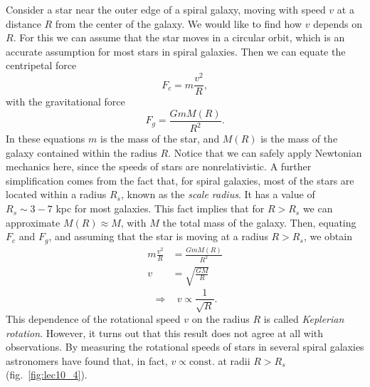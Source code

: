 Consider a star near the outer edge of a spiral galaxy, moving with speed $v$ at a distance $R$ from the center of the galaxy. We would like to find how $v$ depends on $R$. For this we can assume that the star moves in a circular orbit, which is an accurate assumption for most stars in spiral galaxies. Then we can equate the centripetal force
\begin{equation}
F_c=m\frac{v^2}{R},
\end{equation}
with the gravitational force
\begin{equation}
F_g=\frac{GmM(R)}{R^2}.
\end{equation}
In these equations $m$ is the mass of the star, and $M(R)$ is the mass of the galaxy contained within the radius $R$. Notice that we can safely apply Newtonian mechanics here, since the speeds of stars are nonrelativistic. A further simplification comes from the fact that, for spiral galaxies, most of the stars are located within a radius $R_s$, known as the {\it scale radius}. It has a value of $R_s\sim 3-7$ kpc for most galaxies. This fact implies that for $R>R_s$ we can approximate $M(R)\approx M$, with $M$ the total mass of the galaxy. Then, equating $F_c$ and $F_g$, and assuming that the star is moving at a radius $R>R_s$, we obtain
\begin{equation}
\begin{split}
m\frac{v^2}{R}&= \frac{GmM(R)}{R^2}\\
v&= \sqrt{\frac{GM}{R}}
\end{split}
\end{equation}
\begin{equation} \label{eq:keplerian_rot}
\Rightarrow~~~~ v\propto \frac{1}{\sqrt{R}}.
\end{equation}
This dependence of the rotational speed $v$ on the radius $R$ is called {\it Keplerian rotation}. However, it turns out that this result does not agree at all with observations. By measuring the rotational speeds of stars in several spiral galaxies astronomers have found that, in fact, $v\propto\mathrm{const.}$ at radii $R>R_s$ (fig.\ \ref{fig:lec10_4}).
